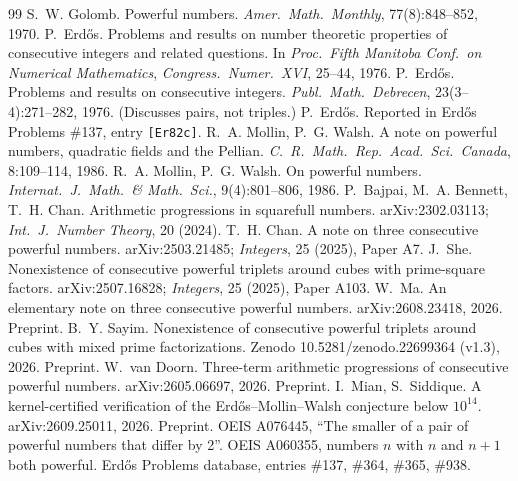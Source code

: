 \documentclass[11pt]{article}
\theoremstyle{definition}
\begin{document}

\begin{thebibliography}{99}
 S.~W. Golomb. Powerful numbers. \emph{Amer.\ Math.\ Monthly}, 77(8):848--852, 1970.
 P.~Erd\H{o}s. Problems and results on number theoretic properties of consecutive integers and related questions. In \emph{Proc.\ Fifth Manitoba Conf.\ on Numerical Mathematics}, \emph{Congress.\ Numer.\ XVI}, 25--44, 1976.
 P.~Erd\H{o}s. Problems and results on consecutive integers. \emph{Publ.\ Math.\ Debrecen}, 23(3--4):271--282, 1976. (Discusses pairs, not triples.)
 P.~Erd\H{o}s. Reported in Erd\H{o}s Problems \#137, entry \texttt{[Er82c]}.
 R.~A. Mollin, P.~G. Walsh. A note on powerful numbers, quadratic fields and the Pellian. \emph{C.\ R.\ Math.\ Rep.\ Acad.\ Sci.\ Canada}, 8:109--114, 1986.
 R.~A. Mollin, P.~G. Walsh. On powerful numbers. \emph{Internat.\ J.\ Math.\ \& Math.\ Sci.}, 9(4):801--806, 1986.
 P.~Bajpai, M.~A. Bennett, T.~H. Chan. Arithmetic progressions in squarefull numbers. arXiv:2302.03113; \emph{Int.\ J.\ Number Theory}, 20 (2024).
 T.~H. Chan. A note on three consecutive powerful numbers. arXiv:2503.21485; \emph{Integers}, 25 (2025), Paper A7.
 J.~She. Nonexistence of consecutive powerful triplets around cubes with prime-square factors. arXiv:2507.16828; \emph{Integers}, 25 (2025), Paper A103.
 W.~Ma. An elementary note on three consecutive powerful numbers. arXiv:2608.23418, 2026. Preprint.
 B.~Y. Sayim. Nonexistence of consecutive powerful triplets around cubes with mixed prime factorizations. Zenodo 10.5281/zenodo.22699364 (v1.3), 2026. Preprint.
 W.~van Doorn. Three-term arithmetic progressions of consecutive powerful numbers. arXiv:2605.06697, 2026. Preprint.
 I.~Mian, S.~Siddique. A kernel-certified verification of the Erd\H{o}s--Mollin--Walsh conjecture below $10^{14}$. arXiv:2609.25011, 2026. Preprint.
 OEIS A076445, ``The smaller of a pair of powerful numbers that differ by 2''.
 OEIS A060355, numbers $n$ with $n$ and $n+1$ both powerful.
 Erd\H{o}s Problems database, entries \#137, \#364, \#365, \#938.
\end{thebibliography}
\end{document}
